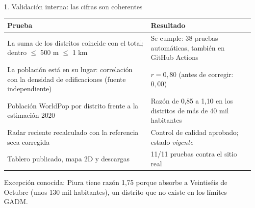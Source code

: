 \documentclass[aspectratio=169,11pt]{beamer}
\begin{document}
\begin{frame}{1. Validación interna: las cifras son coherentes}
\small
\begin{tabularx}{\textwidth}{YL{4.8cm}}\toprule
\textbf{Prueba} & \textbf{Resultado}\\\midrule
La suma de los distritos coincide con el total; dentro $\leq$ 500 m $\leq$ 1 km & Se cumple: 38 pruebas automáticas, también en GitHub Actions\\
La población está en su lugar: correlación con la densidad de edificaciones (fuente independiente) & $r = 0{,}80$ \quad (antes de corregir: $0{,}00$)\\
Población WorldPop por distrito frente a la estimación 2020 & Razón de 0,85 a 1,10 en los distritos de más de 40 mil habitantes\\
Radar reciente recalculado con la referencia seca corregida & Control de calidad aprobado; estado \emph{vigente}\\
Tablero publicado, mapa 2D y descargas & 11/11 pruebas contra el sitio real\\\bottomrule
\end{tabularx}
\vspace{3mm}

\footnotesize\color{gris} Excepción conocida: Piura tiene razón 1,75 porque absorbe a Veintiséis de Octubre (unos 130 mil habitantes), un distrito que no existe en los límites GADM.
\end{frame}
\end{document}
